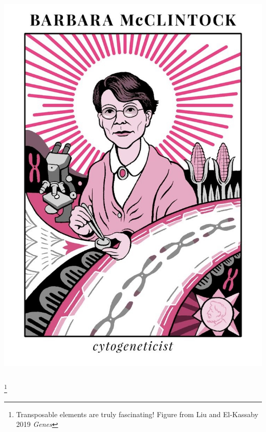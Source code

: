 \documentclass{beamer}
\newcommand\blfootnote[1]{%
	\begingroup
	\renewcommand\thefootnote{}\footnote{#1}%
	\addtocounter{footnote}{-1}%
	\endgroup
}
\begin{document}
\begin{frame}
\begin{columns}
\begin{column}{0.4\textwidth}
				\centering	\includegraphics[keepaspectratio, width  = \textwidth]{img/mcclintock}\\
				
			\end{column}
		\end{columns}
		\blfootnote{Transposable elements are truly fascinating! Figure from Liu and El-Kassaby 2019 \textit{Genes}}
	\end{frame}
	
\end{document}
